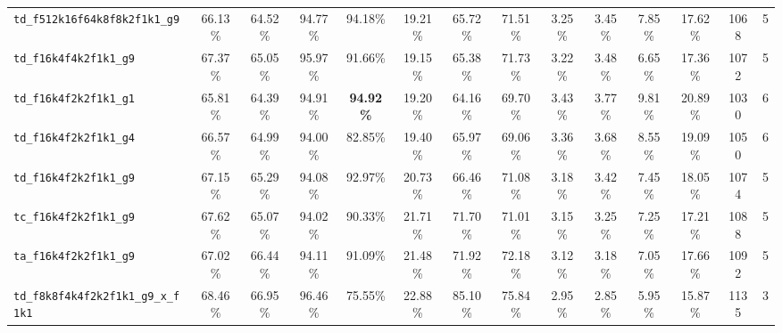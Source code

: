 \documentclass{article}
\begin{document}
\begin{table}[t]
{\begin{minipage}{\linewidth}
{\begin{tabular}{@{}l|ccccccc|cccc|cc@{}}
	\texttt{td\_f512k16f64k8f8k2f1k1\_g9}          &          66.13\% &          64.52\% &          94.77\% &          94.18\% &          19.21\% &          65.72\% &          71.51\% &           3.25\% &           3.45\% &           7.85\% &          17.62\% &          1068 &           5  \\
	\texttt{td\_f16k4f4k2f1k1\_g9}                 &          67.37\% &          65.05\% &          95.97\% &          91.66\% &          19.15\% &          65.38\% &          71.73\% &           3.22\% &           3.48\% &           6.65\% &          17.36\% &          1072 &           5  \\
	\texttt{td\_f16k4f2k2f1k1\_g1}                 &          65.81\% &          64.39\% &          94.91\% & \textbf{94.92\%} &          19.20\% &          64.16\% &          69.70\% &           3.43\% &           3.77\% &           9.81\% &          20.89\% &          1030 &          6  \\
	\texttt{td\_f16k4f2k2f1k1\_g4}                 &          66.57\% &          64.99\% &          94.00\% &          82.85\% &          19.40\% &          65.97\% &          69.06\% &           3.36\% &           3.68\% &           8.55\% &          19.09\% &          1050 &          6  \\
	\texttt{td\_f16k4f2k2f1k1\_g9}                 &          67.15\% &          65.29\% &          94.08\% &          92.97\% &          20.73\% &          66.46\% &          71.08\% &           3.18\% &           3.42\% &           7.45\% &          18.05\% &          1074 &           5  \\
	\texttt{tc\_f16k4f2k2f1k1\_g9}                 &          67.62\% &          65.07\% &          94.02\% &          90.33\% &          21.71\% &          71.70\% &          71.01\% &           3.15\% &           3.25\% &           7.25\% &          17.21\% &          1088 &           5  \\
	\texttt{ta\_f16k4f2k2f1k1\_g9}                 &          67.02\% &          66.44\% &          94.11\% &          91.09\% &          21.48\% &          71.92\% &          72.18\% &           3.12\% &           3.18\% &           7.05\% &          17.66\% &          1092 &           5  \\
	\midrule
	\texttt{td\_f8k8f4k4f2k2f1k1\_g9\_x\_f1k1}     &          68.46\% &          66.95\% &          96.46\% &          75.55\% &          22.88\% &          85.10\% &          75.84\% &           2.95\% &           2.85\% &           5.95\% &          15.87\% &          1135 &           3  \\

\end{tabular}}
\end{minipage}}
\end{table}
\end{document}
